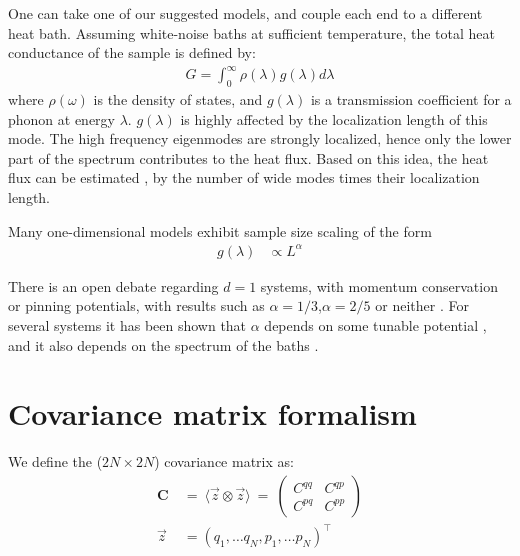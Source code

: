 One can take one of our suggested models, and couple each end to a different heat bath.
Assuming white-noise baths at sufficient temperature, the total heat conductance of the sample is defined by:
\begin{align}
G = \int_0^\infty \rho(\lambda) g(\lambda) d\lambda
\end{align}
where $\rho(\omega)$ is the density of states, and $g(\lambda)$ is 
a transmission coefficient for a phonon at energy $\lambda$.
$g(\lambda)$ is highly affected by the localization length of this mode\cite{tong_wave_1999}.
The high frequency eigenmodes are strongly localized, hence only the
lower part of the spectrum contributes to the heat flux. Based on this idea,
the heat flux can be estimated \cite{lepri_thermal_2001,lepri_thermal_2003,bodyfelt_unpub},
by the number of wide modes times their localization length.

 
Many one-dimensional models 
\cite{narayan_anomalous_2002,dhar_heat_2001,lepri_anomalous_1998,savin_heat_2002} 
exhibit sample size scaling of the form
%
\begin{align}
g(\lambda)    &\propto L^\alpha
\end{align}

There is an open debate regarding $d=1$ systems,
with momentum conservation or pinning potentials, 
with results such as $\alpha=1/3$,$\alpha=2/5$ or neither
\cite{narayan_anomalous_2002,delfini_comment_2008,dhar_dhar_2008,wang_power-law_2011,basile_momentum_2006}.
For several systems it has been shown that $\alpha$ depends on some tunable potential \cite{tong_wave_1999},
and it also depends on the spectrum of the baths \cite{dhar_heat_2001}.




\section{Covariance matrix formalism}

We define the ($2N\times 2N$) covariance matrix as:
\begin{align}
\mathbf{C} \ &=\ \langle \vec{z}\otimes \vec{z}\rangle \ =\ 
              \begin{pmatrix} 
                C^{qq} & C^{qp} \\
                C^{pq} & C^{pp}
            \end{pmatrix}
\\
\vec{z} &= (q_1,\ldots q_N, p_1,\ldots p_N)^\intercal
\end{align}


